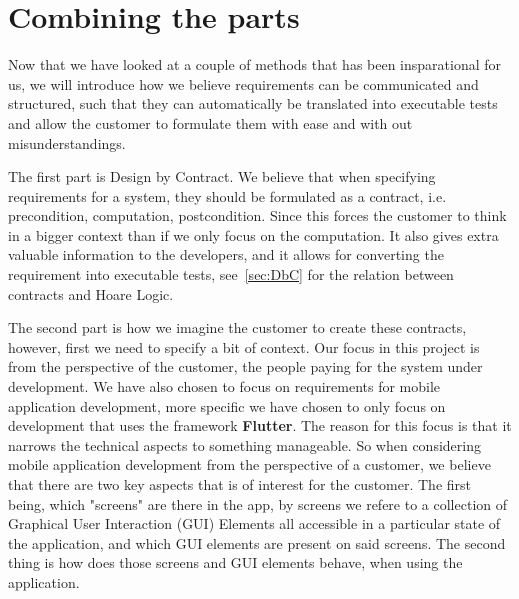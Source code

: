 \section{Combining the parts}
Now that we have looked at a couple of methods that has been insparational for us, we will introduce how we believe requirements can be communicated and structured, such that they can automatically be translated into executable tests and allow the customer to formulate them with ease and with out misunderstandings.

The first part is Design by Contract.
We believe that when specifying requirements for a system, they should be formulated as a contract, i.e. precondition, computation, postcondition. 
Since this forces the customer to think in a bigger context than if we only focus on the computation.
It also gives extra valuable information to the developers, and it allows for converting the requirement into executable tests, see~\autoref{sec:DbC} for the relation between contracts and Hoare Logic.

The second part is how we imagine the customer to create these contracts, however, first we need to specify a bit of context.
Our focus in this project is from the perspective of the customer, the people paying for the system under development.
We have also chosen to focus on requirements for mobile application development, more specific we have chosen to only focus on development that uses the framework \textbf{Flutter}.
The reason for this focus is that it narrows the technical aspects to something manageable.
So when considering mobile application development from the perspective of a customer, we believe that there are two key aspects that is of interest for the customer.
The first being, which "screens" are there in the app, by screens we refere to a collection of Graphical User Interaction (GUI) Elements all accessible in a particular state of the application, and which GUI elements are present on said screens.
The second thing is how does those screens and GUI elements behave, when using the application.

